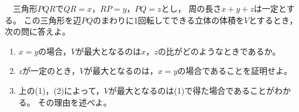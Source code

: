 \begin{problem}
  　三角形$PQR$で$QR=x$，$RP=y$，$PQ=z$とし，
周の長さ$x+y+z$は一定とする。
この三角形を辺$PQ$のまわりに1回転してできる立体の体積を$V$とするとき，
次の問に答えよ。
\begin{enumerate}
\item $x=y$の場合，$V$が最大となるのは$x$，$z$の比がどのようなときであるか。
\item $z$が一定のとき，$V$が最大となるのは，$x=y$の場合であることを証明せよ。
\item 上の(1)，(2)によって，$V$が最大となるのは(1)で得た場合であることがわかる。
その理由を述べよ。
\end{enumerate}
\end{problem}
